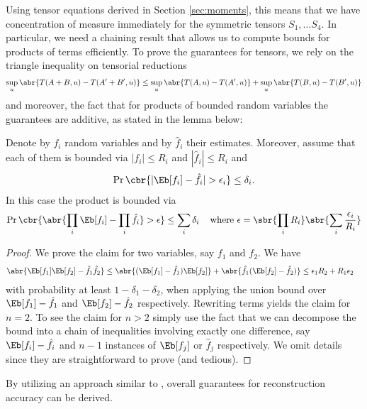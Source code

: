 \documentclass[twoside,11pt]{article}
\begin{document}
{\vspace{-5mm}
Using tensor equations derived in Section \ref{sec:moments}, this means that we have concentration of
measure immediately for the symmetric tensors $S_1, \ldots S_4$. 
 In particular, we need a chaining result that allows us to compute bounds for products of terms
efficiently. 
To prove the guarantees for tensors, we rely on the triangle
inequality on tensorial reductions
\begin{align}
  \sup_u \abr{T(A+B,u) -T(A'+B',u)}
 \leq
  \sup_u \abr{T(A,u) - T(A',u)} + 
  \sup_u \abr{T(B,u) - T(B',u)} \nonumber
\end{align}
and moreover, the fact that for products of bounded random variables
the guarantees are additive, as stated in the lemma below:
\begin{lemma}
  \label{lem:chaining}
  Denote by $f_i$ random variables and by $\hat{f}_i$ their
  estimates. Moreover, assume that each of them is bounded via $|f_i|
  \leq R_i$ and $|\hat{f}_i| \leq R_i$ and 
  \begin{align}
    \label{eq:bound-eff}
    \Pr\cbr{|\Eb[f_i] - \hat{f}_i| > \epsilon_i} \leq \delta_i.
  \end{align}
  In this case the product is bounded via
  \begin{align}
    \label{eq:product}
    \Pr\cbr{\abr{\prod_i \Eb[f_i] - \prod_i \hat{f}_i} > \epsilon} \leq
    \sum_i \delta_i \;\;\;
 \text{ where }
    \epsilon = \sbr{\prod_i R_i} \sbr{\sum_i \frac{\epsilon_i}{R_i}}
  \end{align}
\end{lemma}
\begin{proof}
  We prove the claim for two variables, say $f_1$ and $f_2$. We have
  \begin{align*}
    \abr{\Eb[f_1] \Eb[f_2] - \hat{f}_1 \hat{f}_2} &\leq
    \abr{(\Eb[f_1] - \hat{f}_1) \Eb[f_2]} + \abr{\hat{f}_1 (\Eb[f_2] - \hat{f}_2)}
    \leq
    \epsilon_1 R_2 + R_1 \epsilon_2
  \end{align*}
  with probability at least $1 - \delta_1 - \delta_2$, when applying
  the union bound over $\Eb[f_1] - \hat{f}_1$ and $\Eb[f_2] -
  \hat{f}_2$ respectively. Rewriting terms yields the claim for $n =
  2$. To see the claim for $n > 2$ simply use the fact that we can
  decompose the bound into a chain of inequalities involving exactly
  one difference, say $\Eb[f_i] - \hat{f}_i$ and $n-1$ instances of
  $\Eb[f_j]$ or $\hat{f}_j$ respectively. We omit details since they
  are straightforward to prove (and tedious).
\end{proof}
By utilizing an approach similar to
\cite{AnaFosHsuKakLiu12}, overall guarantees for 
reconstruction accuracy can be derived.

}
\end{document}
